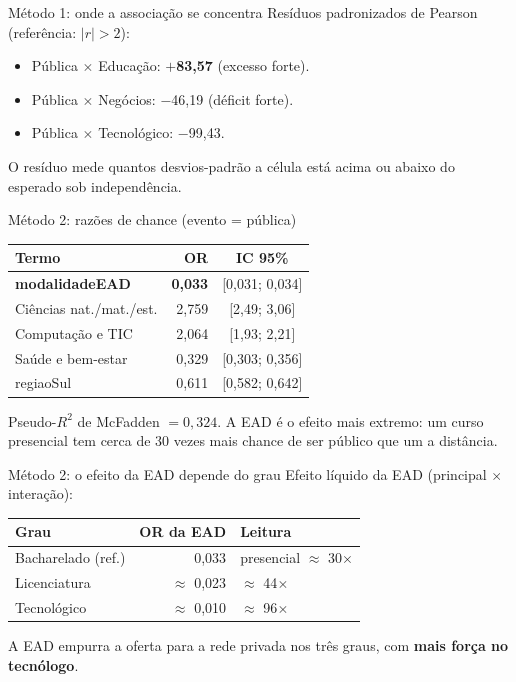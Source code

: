 \documentclass{beamer}
\begin{document}
\begin{frame}{Método 1: onde a associação se concentra}
  Resíduos padronizados de Pearson (referência: $|r|>2$):
  \begin{itemize}
    \item Pública $\times$ Educação: \textbf{$+$83,57} (excesso forte).
    \item Pública $\times$ Negócios: $-$46,19 (déficit forte).
    \item Pública $\times$ Tecnológico: $-$99,43.
  \end{itemize}
  \vspace{.5em}
  O resíduo mede quantos desvios-padrão a célula está acima ou abaixo do esperado sob independência.
\end{frame}

\begin{frame}{Método 2: razões de chance (evento = pública)}
  \begin{table}
    \centering
    \small
    \begin{tabular}{lrc}
      \toprule
      Termo & OR & IC 95\% \\
      \midrule
      \textbf{modalidadeEAD}   & \textbf{0,033} & [0,031; 0,034] \\
      Ciências nat./mat./est.  & 2,759 & [2,49; 3,06] \\
      Computação e TIC         & 2,064 & [1,93; 2,21] \\
      Saúde e bem-estar        & 0,329 & [0,303; 0,356] \\
      regiaoSul                & 0,611 & [0,582; 0,642] \\
      \bottomrule
    \end{tabular}
  \end{table}
  Pseudo-$R^2$ de McFadden $=0{,}324$. A EAD é o efeito mais extremo: um curso presencial tem cerca de 30 vezes mais chance de ser público que um a distância.
\end{frame}

\begin{frame}{Método 2: o efeito da EAD depende do grau}
  Efeito líquido da EAD (principal $\times$ interação):
  \begin{table}
    \centering
    \begin{tabular}{lrl}
      \toprule
      Grau & OR da EAD & Leitura \\
      \midrule
      Bacharelado (ref.) & 0,033 & presencial $\approx$ 30$\times$ \\
      Licenciatura & $\approx$ 0,023 & $\approx$ 44$\times$ \\
      Tecnológico  & $\approx$ 0,010 & $\approx$ 96$\times$ \\
      \bottomrule
    \end{tabular}
  \end{table}
  A EAD empurra a oferta para a rede privada nos três graus, com \textbf{mais força no tecnólogo}.
\end{frame}
\end{document}
